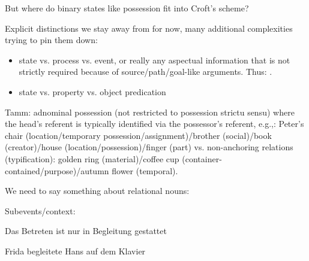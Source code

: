 \documentclass[a4paper]{article}
\begin{document}
But where do binary states like possession fit into Croft's scheme?

Explicit distinctions we stay away from for now, many additional complexities
trying to pin them down:

\begin{itemize}
    \item state vs. process vs. event, or really any aspectual information that
        is not strictly required because of source/path/goal-like arguments.
        Thus: .
    \item state vs. property vs. object predication
\end{itemize}

Tamm: adnominal possession (not restricted to possession strictu sensu) where
the head's referent is typically identified via the possessor's referent,
e.g.,: Peter's chair (location/temporary possession/assignment)/brother
(social)/book (creator)/house (location/possession)/finger (part) vs.
non-anchoring relations (typification): golden ring (material)/coffee cup
(container-contained/purpose)/autumn flower (temporal).

We need to say something about relational nouns:


Subevents/context:

Das Betreten ist nur in Begleitung gestattet

Frida begleitete Hans auf dem Klavier

\clearpage



\end{document}
